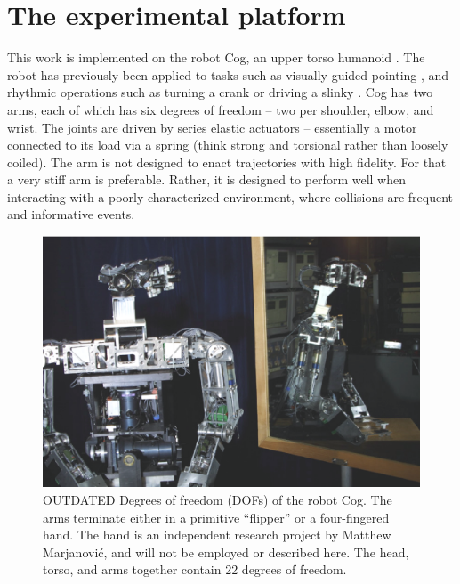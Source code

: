 
\section{The experimental platform}

This work is implemented on the robot Cog, an upper torso humanoid
\cite{brooks99cog}.  The robot has previously been applied to tasks
such as visually-guided pointing \cite{Marjanovic-96-SAB}, and
rhythmic operations such as turning a crank or driving a slinky
\cite{williamson98neural}.  Cog has two arms, each of which has six
degrees of freedom -- two per shoulder, elbow, and wrist.  The joints
are driven by series elastic actuators \cite{williamson95series} --
essentially a motor connected to its load via a spring (think strong
and torsional rather than loosely coiled).  The arm is not designed to
enact trajectories with high fidelity.  For that a very stiff arm is
preferable.  Rather, it is designed to perform well when interacting
with a poorly characterized environment, where collisions are frequent
and informative events.

\begin{figure}[tbh]
\centerline{
\includegraphics[width=12cm]{mirror-cog.eps}
}
\caption{ 
%
  OUTDATED Degrees of freedom (DOFs) of the robot Cog.  The arms terminate
  either in a primitive ``flipper'' or a four-fingered hand.  
\ifverbose
The hand
  is an independent research project by Matthew Marjanovi\'{c}, and
  will not be employed or described here.  
\fi
  The head, torso, and arms
  together contain 22 degrees of freedom.
%
}
\label{fig:cog-schematic}
\end{figure}


